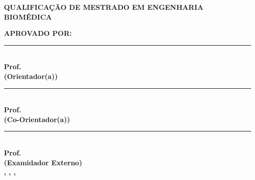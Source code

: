 \begin{folhadeaprovacao}
    \center
    \vspace*{0in}
	{\textbf{\imprimirinstituicao}}
	\par
	{\textbf{\imprimirdepartamento}}

	\vspace{1.5 in}
	{\textbf{\large \imprimirtitulo}}
    	\vspace{0.25 in}
    	\par
         {\textbf{\large \imprimirautor}}
    	\vspace{0.25 in}

	\textbf{QUALIFICAÇÃO DE MESTRADO EM ENGENHARIA BIOMÉDICA}
	

\flushleft	
	\vspace{0.5 in}    
    \textbf{APROVADO POR:}\\
    \vspace{0.5 in}    
    \rule{10cm}{.1mm}\\
    {\textbf{Prof. \imprimirorientador} \\ \textbf{(Orientador(a))} }\\
    \vspace{0.5 in}    
   \rule{10cm}{.1mm}\\ 
   {\textbf{Prof. \imprimirmembroCoorientador} \\ \textbf{(Co-Orientador(a))}}\\
    \vspace{0.5 in}    
   \rule{10cm}{.1mm}\\
    {\textbf{Prof. \imprimirmembroconvidadodois} \\ \textbf{(Examidador Externo)}}\\
        
    \vspace{0.75 in}
    \textbf{\imprimirlocal, \imprimirdia, \imprimirmes, \imprimirdata}
    
    \end{folhadeaprovacao}

